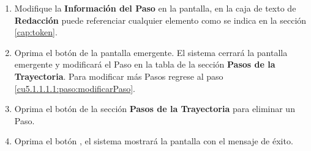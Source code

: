 \begin{enumerate}
	
	\item Modifique la \textbf{Información del Paso} en la pantalla, en la caja de texto de \textbf{Redacción} puede referenciar cualquier elemento como se indica en la sección \ref{cap:token}.
	
	\item Oprima el botón  de la pantalla emergente. El sistema cerrará la pantalla emergente y modificará el Paso en la tabla de la sección \textbf{Pasos de la Trayectoria}. Para modificar más Pasos regrese al paso \ref{cu5.1.1.1.1:paso:modificarPaso}.
	
	\item Oprima el botón \btnEliminar de la sección \textbf{Pasos de la Trayectoria} para eliminar un Paso.
	
	\item Oprima el botón , el sistema mostrará la pantalla  con el mensaje de éxito.
\end{enumerate}
